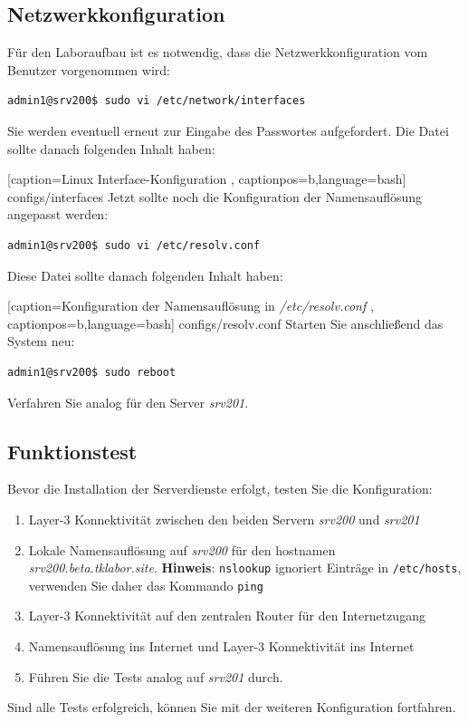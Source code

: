 \subsection{Netzwerkkonfiguration}
Für den Laboraufbau ist es notwendig, dass die Netzwerkkonfiguration vom
Benutzer vorgenommen wird:
\begin{lstlisting}
admin1@srv200$ sudo vi /etc/network/interfaces
\end{lstlisting}
Sie werden eventuell erneut zur Eingabe des Passwortes aufgefordert. Die Datei
sollte danach folgenden Inhalt haben:

    [caption={Linux Interface-Konfiguration}
       \label{lst:interfaces},
       captionpos=b,language=bash]
{configs/interfaces}
Jetzt sollte noch die Konfiguration der Namensauflösung angepasst werden:
\begin{lstlisting}
admin1@srv200$ sudo vi /etc/resolv.conf
\end{lstlisting}
Diese Datei sollte danach folgenden Inhalt haben:

    [caption={Konfiguration der Namensauflösung in \textit{/etc/resolv.conf}}
       \label{lst:resolv.conf},
       captionpos=b,language=bash]
{configs/resolv.conf}
Starten Sie anschließend das System neu:
\begin{lstlisting}
admin1@srv200$ sudo reboot
\end{lstlisting}
Verfahren Sie analog für den Server \textit{srv201}.

\subsection{Funktionstest}
Bevor die Installation der Serverdienste erfolgt, testen Sie die Konfiguration:
\begin{enumerate}
  \item Layer-3 Konnektivität zwischen den beiden Servern \textit{srv200} und
  \textit{srv201}
  \item Lokale Namensauflösung auf \textit{srv200} für den hostnamen
  \textit{srv200.beta.tklabor.site}. \textbf{Hinweis}: \texttt{nslookup}
  ignoriert Einträge in \texttt{/etc/hosts}, verwenden Sie daher das
  Kommando \texttt{ping}
  \item Layer-3 Konnektivität auf den zentralen Router für den Internetzugang
  \item Namensauflösung ins Internet und Layer-3 Konnektivität ins Internet
  \item Führen Sie die Tests analog auf \textit{srv201} durch.
\end{enumerate}

Sind alle Tests erfolgreich, können Sie mit der weiteren Konfiguration
fortfahren.
